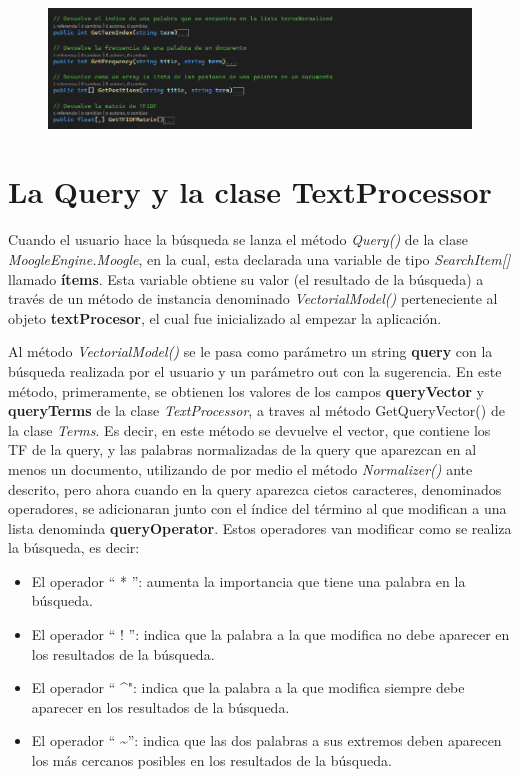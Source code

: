 \documentclass[a4paper,12pt]{report}
\begin{document}
\begin{figure}[h]
    \includegraphics*[width=16cm]{fotos/05 - Metodos Getter de Terms.png}
\end{figure}

\section*{La Query y la clase TextProcessor}

Cuando el usuario hace la búsqueda se lanza el método \textit{Query()} de la clase \textit{MoogleEngine.Moogle}, en
la cual, esta declarada una variable de tipo \textit{SearchItem[]} llamado \textbf{ítems}. Esta variable obtiene su valor
(el resultado de la búsqueda) a través de un método de instancia denominado \textit{VectorialModel()}
perteneciente al objeto \textbf{textProcesor}, el cual fue inicializado al empezar la aplicación.

Al método \textit{VectorialModel()} se le pasa como parámetro un string \textbf{query} con la búsqueda realizada
por el usuario y un parámetro out con la sugerencia. En este método, primeramente, se obtienen los
valores de los campos \textbf{queryVector} y \textbf{queryTerms} de la clase \textit{TextProcessor}, a traves al método
GetQueryVector() de la clase \textit{Terms}. Es decir, en este método se devuelve el vector, que contiene los
TF de la query, y las palabras normalizadas de la query que aparezcan en al menos un documento,
utilizando de por medio el método \textit{Normalizer()} ante descrito, pero ahora cuando en la query
aparezca cietos caracteres, denominados operadores, se adicionaran junto con el índice del término
al que modifican a una lista denominda \textbf{queryOperator}. Estos operadores van modificar como se realiza la búsqueda, es decir:
\begin{itemize}
    \item El operador “ * ”: aumenta la importancia que tiene una palabra en la búsqueda.
    \item El operador “ ! ”: indica que la palabra a la que modifica no debe aparecer en los resultados de
    la búsqueda. 
    \item El operador “ \textasciicircum \space ": indica que la palabra a la que modifica siempre debe aparecer en los resultados
    de la búsqueda.
    \item El operador “ \textasciitilde \space ”: indica que las dos palabras a sus extremos deben aparecen los más cercanos
    posibles en los resultados de la búsqueda.   
\end{itemize}
\end{document}
